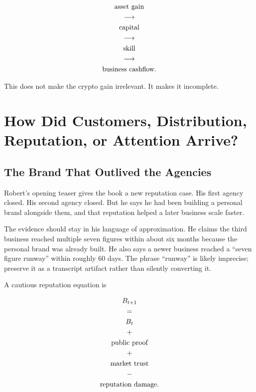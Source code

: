 \documentclass[11pt,oneside]{book}
\begin{document}
\begin{equation}
\begin{gathered}
\hbox{asset gain}\\
\longrightarrow\\
\hbox{capital}\\
\longrightarrow\\
\hbox{skill}\\
\longrightarrow\\
\hbox{business cashflow}.
\end{gathered}
\end{equation}

This does not make the crypto gain irrelevant. It makes it incomplete.

\chapter{How Did Customers, Distribution, Reputation, or Attention Arrive?}

\section{The Brand That Outlived the Agencies}

Robert's opening teaser gives the book a new reputation case. His first agency closed. His second agency closed. But he says he had been building a personal brand alongside them, and that reputation helped a later business scale faster.

The evidence should stay in his language of approximation. He claims the third business reached multiple seven figures within about six months because the personal brand was already built. He also says a newer business reached a ``seven figure runway'' within roughly \(60\) days. The phrase ``runway'' is likely imprecise; preserve it as a transcript artifact rather than silently converting it.

A cautious reputation equation is

\begin{equation}
\begin{gathered}
B_{t+1}\\
=\\
B_t\\
+\\
\hbox{public proof}\\
+\\
\hbox{market trust}\\
-\\
\hbox{reputation damage}.
\end{gathered}
\end{equation}
\end{document}
